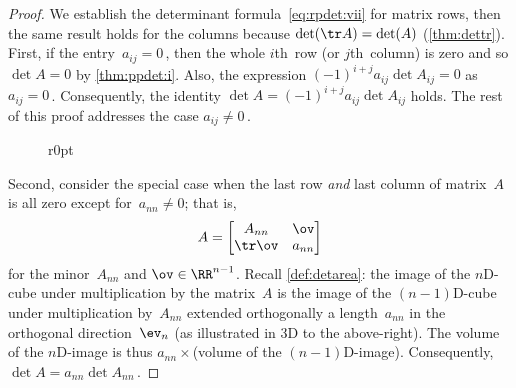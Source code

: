 \begin{proof} 
We establish the determinant formula~\eqref{eq:rpdet:vii} for matrix rows,  then the same result holds for the columns because \(\det(\tr A)=\det(A)\) (\cref{thm:dettr}).
First, if the entry~\(a_{ij}=0\)\,, then the whole \(i\)th~row (or \(j\)th~column) is zero and so \(\det A=0\) by \cref{thm:ppdet:i}.  
Also, the expression \((-1)^{i+j}a_{ij}\det A_{ij}=0\) as \(a_{ij}=0\)\,.  
Consequently, the identity \(\det A=(-1)^{i+j}a_{ij}\det A_{ij}\) holds.
The rest of this proof addresses the case \(a_{ij}\neq 0\)\,.

\begin{wrapfigure}[8]r{0pt}
\end{wrapfigure}
Second, consider the special case when the last row \emph{and} last column of matrix~\(A\) is all zero except for~\(a_{nn}\neq0\); that is, 
\begin{equation*}
A=\begin{bmatrix} A_{nn}&\ov\\\tr\ov&a_{nn} \end{bmatrix}
\end{equation*}
for the minor~\(A_{nn}\) and \(\ov\in\RR^{n-1}\).
Recall \cref{def:detarea}: the image of the \(n\)D-cube under multiplication by the matrix~\(A\) is the image of the \((n-1)\)D-cube under multiplication by~\(A_{nn}\) extended orthogonally a length~\(a_{nn}\) in the orthogonal direction~\(\ev_n\) (as illustrated in 3D to the above-right).
The volume of the \(n\)D-image is thus \(a_{nn}\times{}\)(volume of the \((n-1)\)D-image).
Consequently, \(\det A=a_{nn}\det A_{nn}\)\,.


\end{proof}
